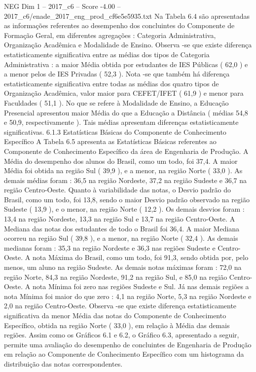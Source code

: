 \begin{textsample}{NEG Dim 1 – 2017\_c6 – Score -4.00 – 2017\_c6/enade\_2017\_eng\_prod\_cf6e5e5935.txt}
Na Tabela 6.4 são apresentadas as informações referentes ao desempenho dos concluintes do Componente de Formação Geral, em diferentes agregações : Categoria Administrativa, Organização Acadêmica e Modalidade de Ensino.
Observa -se que existe diferença estatisticamente significativa entre as médias dos tipos de Categoria Administrativa : a maior Média obtida por estudantes de IES Públicas ( 62,0 ) e a menor pelos de IES Privadas ( 52,3 ).
Nota -se que também há diferença estatisticamente significativa entre todas as médias dos quatro tipos de Organização Acadêmica, valor maior para CEFET/IFET ( 61,9 ) e menor para Faculdades ( 51,1 ).
No que se refere à Modalidade de Ensino, a Educação Presencial apresentou maior Média do que a Educação a Distância ( médias 54,8 e 50,9, respectivamente ).
Tais médias apresentam diferenças estatisticamente significativas. 6.1.3 Estatísticas Básicas do Componente de Conhecimento Específico A Tabela 6.5 apresenta as Estatísticas Básicas referentes ao Componente de Conhecimento Específico da área de Engenharia de Produção.
A Média do desempenho dos alunos do Brasil, como um todo, foi 37,4.
A maior Média foi obtida na região Sul ( 39,9 ), e a menor, na região Norte ( 33,0 ).
As demais médias foram : 36,5 na região Nordeste, 37,2 na região Sudeste e 36,7 na região Centro-Oeste.
Quanto à variabilidade das notas, o Desvio padrão do Brasil, como um todo, foi 13,8, sendo o maior Desvio padrão observado na região Sudeste ( 13,9 ), e o menor, na região Norte ( 12,2 ).
Os demais desvios foram : 13,4 na região Nordeste, 13,3 na região Sul e 13,7 na região Centro-Oeste.
A Mediana das notas dos estudantes de todo o Brasil foi 36,4.
A maior Mediana ocorreu na região Sul ( 39,8 ), e a menor, na região Norte ( 32,4 ).
As demais medianas foram : 35,3 na região Nordeste e 36,3 nas regiões Sudeste e Centro-Oeste.
A nota Máxima do Brasil, como um todo, foi 91,3, sendo obtida por, pelo menos, um aluno na região Sudeste.
As demais notas máximas foram : 72,0 na região Norte, 84,3 na região Nordeste, 91,2 na região Sul, e 85,0 na região Centro-Oeste.
A nota Mínima foi zero nas regiões Sudeste e Sul.
Já nas demais regiões a nota Mínima foi maior do que zero : 4,1 na região Norte, 5,3 na região Nordeste e 2,0 na região Centro-Oeste.
Observa -se que existe diferença estatisticamente significativa da menor Média das notas do Componente de Conhecimento Específico, obtida na região Norte ( 33,0 ), em relação à Média das demais regiões.
Assim como os Gráficos 6.1 e 6.2, o Gráfico 6.3, apresentado a seguir, permite uma avaliação do desempenho de concluintes de Engenharia de Produção em relação ao Componente de Conhecimento Específico com um histograma da distribuição das notas correspondentes.

\end{textsample}
